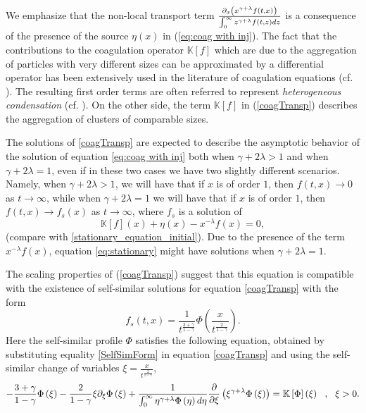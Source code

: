 \documentclass[11pt]{article}
\numberwithin{equation}{section}
\theoremstyle{plain}
\newcommand{\der}{\textup{d}}
\begin{document}
We emphasize that the non-local transport term $\frac{\partial_{x}\left(
x^{\gamma+\lambda}f\left(  t,x\right)  \right)  }{\int_{0}^{\infty}%
z^{\gamma+\lambda}f\left(  t,z\right)  \der z}$ is a consequence of the presence
of the source $\eta\left(  x\right)  $ in (\ref{eq:coag with inj}). The fact
that the contributions to the coagulation operator $\mathbb{K}\left[
f\right]  $ which are due to the aggregation of particles with very different
sizes can be approximated by a differential operator has been extensively used in the literature of coagulation equations
(cf. \cite{Friedlander}). The resulting first order terms are often
referred to represent \textit{heterogeneous condensation} (cf. \cite{Friedlander}). 
On the other side, the term $\mathbb{K}\left[  f\right]  $ in
(\ref{coagTransp}) describes the aggregation of clusters of comparable sizes.

The solutions of \eqref{coagTransp} are expected to describe the asymptotic behavior of the solution of equation \eqref{eq:coag with inj} both when $\gamma + 2 \lambda > 1$ and when $\gamma + 2 \lambda =1 $, even if in these two cases we have two slightly different scenarios.
Namely, when $\gamma +2\lambda >1$, we will have that if $x$ is of order $1 $, then $f(t, x) \rightarrow 0 $ as $t \rightarrow \infty $, while when $\gamma + 2 \lambda =1 $ we will have that if $x$ is of order $1 $, then  $f(t, x) \rightarrow f_s(x)$ as $t \rightarrow \infty $, where $f_s $ is a solution of 
\begin{equation}\label{eq:stationary}
\mathbb K[f](x) + \eta(x)- x^{-\lambda} f(x)=0, 
\end{equation}
(compare with \eqref{stationary_equation_initial}). Due to the presence of the term $x^{-\lambda}f(x)$, equation \eqref{eq:stationary} might have solutions when $\gamma+2\lambda=1$.


The scaling properties of (\ref{coagTransp}) suggest that this equation is
compatible with the existence of self-similar solutions for equation \eqref{coagTransp} with the form
\begin{equation} \label{SelfSimForm}
f_s\left(t, x \right)  =\frac{1}{t^{\frac{3+\gamma}{1-\gamma}}}\Phi\left(
\frac{x}{t^{\frac{2}{1-\gamma}}}\right).
\end{equation} 
Here the self-similar profile $\Phi$ satisfies the following equation, obtained by substituting equality \eqref{SelfSimForm} in equation \eqref{coagTransp} and using the self-similar change of variables $\xi=\frac{x}{t^{\frac{2}{1-\gamma}}}$,
\begin{equation}\label{eq:ss} 
-\frac{3+\gamma}{1-\gamma}\Phi\left(  \xi\right)  -\frac{2}{1-\gamma}\xi \partial_\xi
\Phi\left(  \xi\right)  +\frac{1}{\int_{0}^{\infty}\eta
	^{\gamma+\lambda}\Phi\left(  \eta\right)  \der \eta}\frac{\partial}{\partial\xi
}\left(  \xi^{\gamma+\lambda}\Phi\left(  \xi\right)  \right)  =\mathbb{K}%
\left[  \Phi\right]  \left(  \xi\right)  \ \ ,\ \ \xi>0. 
\end{equation}
\end{document}
